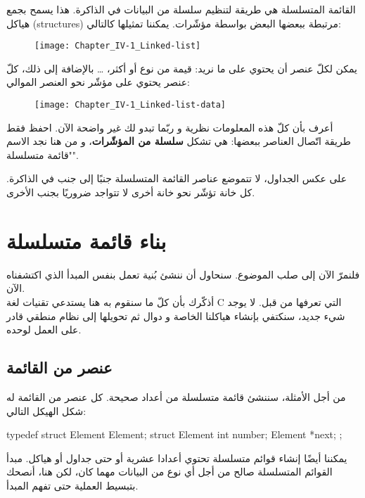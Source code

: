 القائمة المتسلسلة هي طريقة لتنظيم سلسلة من البيانات في الذاكرة. هذا يسمح بجمع هياكل
(\textenglish{structures})
مرتبطة ببعضها البعض بواسطة مؤشّرات. يمكننا تمثيلها كالتالي:

\begin{figure}[H]
	\centering
	\texttt{[image: Chapter\_IV-1\_Linked-list]}
\end{figure}

يمكن لكلّ عنصر أن يحتوي على ما نريد: قيمة من نوع 
أو أكثر،
\dots
بالإضافة إلى ذلك، كلّ عنصر يحتوي على مؤشّر نحو العنصر الموالي:

\begin{figure}[H]
	\centering
	\texttt{[image: Chapter\_IV-1\_Linked-list-data]}
\end{figure}

أعرف بأن كلّ هذه المعلومات نظرية و ربّما تبدو لك غير واضحة الآن. احفظ فقط طريقة اتّصال العناصر ببعضها: هي تشكل 
\textbf{سلسلة من المؤشّرات}،
و من هنا نجد الاسم "قائمة متسلسلة". 

\begin{information}
على عكس الجداول، لا تتموضع عناصر القائمة المتسلسلة جنبًا إلى جنب في الذاكرة. كل خانة تؤشّر نحو خانة أخرى لا تتواجد ضروريًا بجنب الأخرى.
\end{information}

\section{بناء قائمة متسلسلة}

فلنمرّ الآن إلى صلب الموضوع. سنحاول أن ننشئ بُنية تعمل بنفس المبدأ الذي اكتشفناه الآن.\\
أذكّرك بأن كلّ ما سنقوم به هنا يستدعي تقنيات لغة \textenglish{C}
 التي تعرفها من قبل. لا يوجد شيء جديد، سنكتفي بإنشاء هياكلنا الخاصة و دوال ثم تحويلها إلى نظام منطقي قادر على العمل لوحده.

\subsection{عنصر من القائمة}

من أجل الأمثلة، سننشئ قائمة متسلسلة من أعداد صحيحة. كل عنصر من القائمة له شكل الهيكل التالي:

\begin{Csource}
typedef struct Element Element;
struct Element
{
	int number;
	Element *next;
};
\end{Csource}

\begin{information}
يمكننا أيضًا إنشاء قوائم متسلسلة تحتوي أعدادا عشرية أو حتى جداول أو هياكل. مبدأ القوائم المتسلسلة صالح من أجل أي نوع من البيانات مهما كان، لكن هنا، أنصحك بتبسيط العملية حتى تفهم المبدأ.
\end{information}

